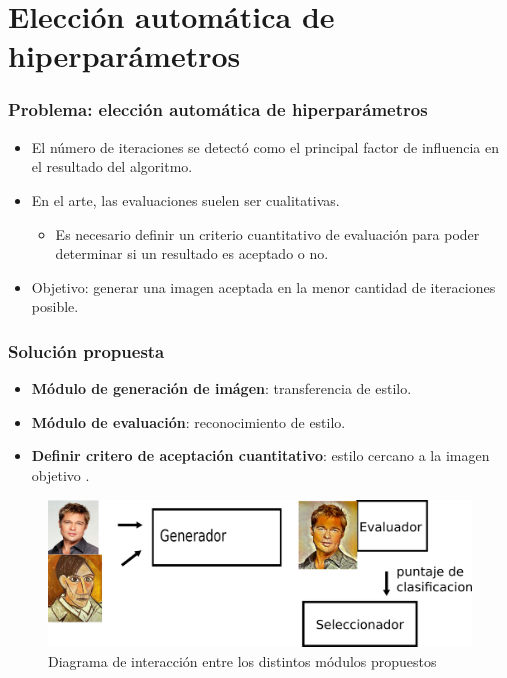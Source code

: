 \documentclass[10pt,center]{beamer}
\begin{document}
\section{Elección automática de hiperparámetros}
\begin{frame}
  \frametitle{Problema: elección automática de hiperparámetros}
  \begin{itemize}
   \item El número de iteraciones se detectó como el principal factor de influencia en el resultado del algoritmo.
   \item En el arte, las evaluaciones suelen ser cualitativas.
   \begin{itemize}
    \item Es necesario definir un criterio cuantitativo de evaluación para poder determinar si un resultado es aceptado o no.
   \end{itemize}
  \item Objetivo: generar una imagen aceptada en la menor cantidad de iteraciones posible.
  \end{itemize}

\end{frame}

\begin{frame}
 \frametitle{Solución propuesta}
  \begin{itemize}
   \item \textbf{Módulo de generación de imágen}: transferencia de estilo.
   \item \textbf{Módulo de evaluación}: reconocimiento de estilo.
   \item \textbf{Definir critero de aceptación cuantitativo}: estilo cercano a la imagen objetivo .
  \end{itemize}
  \begin{figure}[h]
    \begin{center}
      \includegraphics[width=\linewidth]{./img/diagrama.png}
    \end{center}
    \caption{Diagrama de interacción entre los distintos módulos propuestos}
  \end{figure}
\end{frame}
\end{document}
